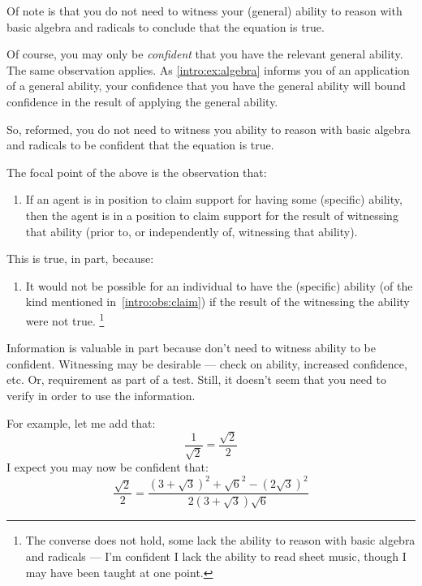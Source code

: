 \begin{note}
  Of note is that you do not need to witness your (general) ability to reason with basic algebra and radicals to conclude that the equation is true.

  Of course, you may only be \emph{confident} that you have the relevant general ability.
  The same observation applies.
  As \ref{intro:ex:algebra} informs you of an application of a general ability, your confidence that you have the general ability will bound confidence in the result of applying the general ability.

  So, reformed, you do not need to witness you ability to reason with basic algebra and radicals to be confident that the equation is true.
\end{note}

\begin{note}[Focus]
  The focal point of the above is the observation that:
  \begin{enumerate}[label=(O\arabic*), ref=(O\arabic*), series=i_ob]
  \item\label{intro:obs:claim} If an agent is in position to claim support for having some (specific) ability, then the agent is in a position to claim support for the result of witnessing that ability (prior to, or independently of, witnessing that ability).
  \end{enumerate}
  This is true, in part, because:
  \begin{enumerate}[label=(O\arabic*), ref=(O\arabic*), resume*=i_ob]
  \item\label{intro:obs:entail} It would not be possible for an individual to have the (specific) ability (of the kind mentioned in~\ref{intro:obs:claim}) if the result of the witnessing the ability were not true.\nolinebreak
    \footnote{The converse does not hold, some lack the ability to reason with basic algebra and radicals --- I'm confident I lack the ability to read sheet music, though I may have been taught at one point.}
  \end{enumerate}
  Information is valuable in part because don't need to witness ability to be confident.
  Witnessing may be desirable --- check on ability, increased confidence, etc. Or, requirement as part of a test.
  Still, it doesn't seem that you need to verify in order to use the information.

  For example, let me add that:
  \[\frac{1}{\sqrt{2}} = \frac{\sqrt{2}}{2}\]
  I expect you may now be confident that:
  \[\frac{\sqrt{2}}{2} = \frac{(3 + \sqrt{3})^{2} + \sqrt{6}^{2} - (2\sqrt{3})^{2}}{2(3 + \sqrt{3})\sqrt{6}}\]
\end{note}

